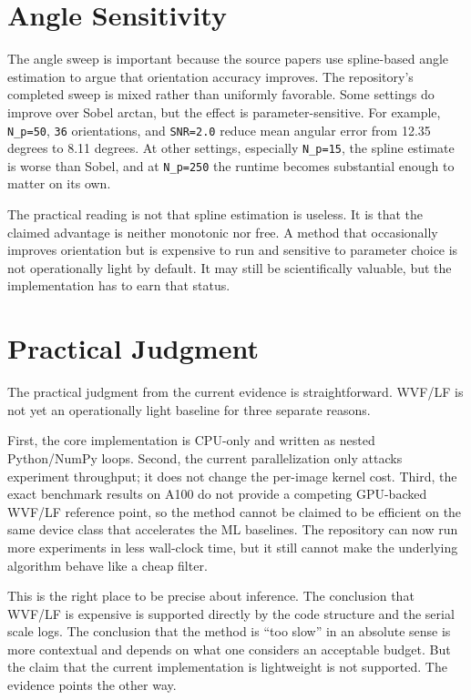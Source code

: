 \documentclass[conference]{IEEEtran}
\begin{document}
\section{Angle Sensitivity}
The angle sweep is important because the source papers use spline-based angle estimation to argue that orientation accuracy improves. The repository's completed sweep is mixed rather than uniformly favorable. Some settings do improve over Sobel arctan, but the effect is parameter-sensitive. For example, \texttt{N\_p=50}, \texttt{36} orientations, and \texttt{SNR=2.0} reduce mean angular error from 12.35 degrees to 8.11 degrees. At other settings, especially \texttt{N\_p=15}, the spline estimate is worse than Sobel, and at \texttt{N\_p=250} the runtime becomes substantial enough to matter on its own.

The practical reading is not that spline estimation is useless. It is that the claimed advantage is neither monotonic nor free. A method that occasionally improves orientation but is expensive to run and sensitive to parameter choice is not operationally light by default. It may still be scientifically valuable, but the implementation has to earn that status.

\section{Practical Judgment}
The practical judgment from the current evidence is straightforward. WVF/LF is not yet an operationally light baseline for three separate reasons.

First, the core implementation is CPU-only and written as nested Python/NumPy loops. Second, the current parallelization only attacks experiment throughput; it does not change the per-image kernel cost. Third, the exact benchmark results on A100 do not provide a competing GPU-backed WVF/LF reference point, so the method cannot be claimed to be efficient on the same device class that accelerates the ML baselines. The repository can now run more experiments in less wall-clock time, but it still cannot make the underlying algorithm behave like a cheap filter.

This is the right place to be precise about inference. The conclusion that WVF/LF is expensive is supported directly by the code structure and the serial scale logs. The conclusion that the method is ``too slow'' in an absolute sense is more contextual and depends on what one considers an acceptable budget. But the claim that the current implementation is lightweight is not supported. The evidence points the other way.
\end{document}
